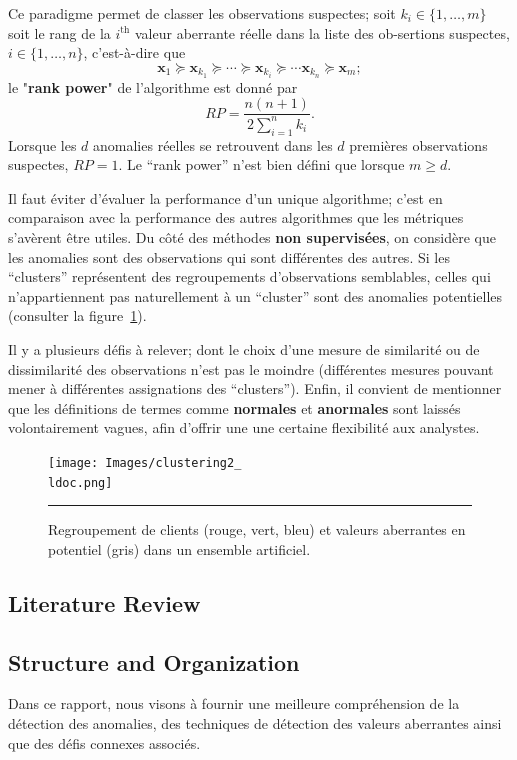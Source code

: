 \par Ce paradigme permet de classer les ob\-ser\-va\-tions suspectes; soit $k_i\in\{1,\ldots,m\}$ soit le rang de la $i^{\text{th}}$ valeur aberrante r\'eelle dans la liste des ob-ser\-tions suspectes, $i\in \{1,\ldots,n\}$, c'est-\`a-dire que $$\mathbf{x}_1\succeq \mathbf{x}_{k_1}\succeq \cdots\succeq\mathbf{x}_{k_i}\succeq \cdots \mathbf{x}_{k_n}\succeq \mathbf{x}_m;$$ le "\textbf{rank power}" de l'algorithme est donn\'e par $$RP=\frac{n(n+1)}{2\sum_{i=1}^nk_i}.$$ Lorsque les $d$ anomalies réelles se retrouvent dans les $d$ premières ob\-ser\-va\-tions suspectes, $RP= 1$. Le ``rank power'' n'est bien défini que lorsque $m\geq d$. \par Il faut \'eviter d'\'evaluer la performance d'un unique algorithme; c'est en comparaison avec la performance des autres algorithmes que les m\'etriques s'av\`erent \^etre utiles.  \newl Du côté des m\'ethodes \textbf{non supervis\'ees}, on consid\`ere que les anomalies sont des ob\-ser\-va\-tions qui sont différentes des autres. Si les ``clusters'' représentent des regroupements d'ob\-ser\-va\-tions semblables, celles qui n'appartiennent pas naturellement \`a un ``cluster'' sont des anomalies potentielles (consulter la figure~\ref{fig:clust2}). \par Il y a plusieurs d\'efis \`a relever; dont le choix  d'une mesure de similarité ou de dissimilarité des observations n'est pas le moindre (différentes mesures pouvant mener à différentes assignations des ``clusters''). \newl Enfin, il convient de mentionner que les définitions de termes comme \textbf{normales} et \textbf{anormales} sont laiss\'es volontairement vagues, afin d'offrir une  une certaine flexibilité aux analystes. 
\begin{figure}[t]
\centering
\texttt{[image: Images/clustering2\_\\ldoc.png]}
\caption{\small Regroupement de clients (rouge, vert, bleu) et valeurs aberrantes en potentiel (gris) dans un ensemble artificiel.}\hrule\label{fig:clust2}
\end{figure}

\subsection{Literature Review}
\newpage
\subsection{Structure and Organization}
Dans ce rapport, nous visons à fournir une meilleure compréhension de la détection des anomalies, des techniques de détection des valeurs aberrantes ainsi que des défis connexes associés. 

